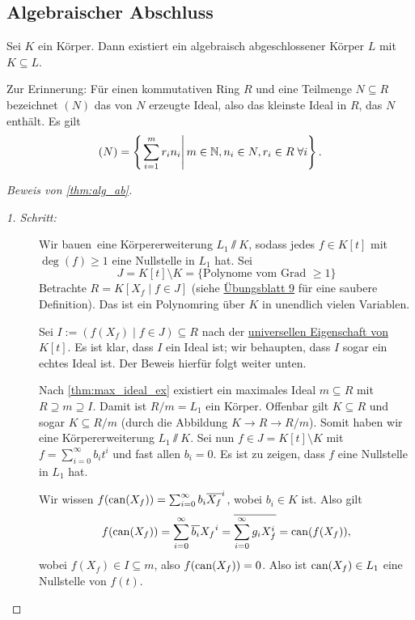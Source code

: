 \documentclass[12pt,a4paper]{scrartcl}
\begin{document}
\subsection{Algebraischer Abschluss}
\begin{satz}\label{thm:alg_ab}
	Sei $K$ ein Körper. Dann existiert ein algebraisch abgeschlossener Körper $L$ mit $K\subseteq L$.
\end{satz}

Zur Erinnerung: Für einen kommutativen Ring $R$ und eine Teilmenge $N\subseteq R$ bezeichnet $(N)$ das von $N$ erzeugte Ideal, also das kleinste Ideal in $R$, das $N$ enthält. Es gilt \[(N) = \left\{\left.\sum_{i = 1}^mr_in_i\right|m\in\mathbb N, n_i\in N, r_i\in R \;\forall i\right\}.\]

\begin{proof}[Beweis von \cref{thm:alg_ab}]
	\leavevmode
	\begin{description}
		\item[\emph{1. Schritt:}] Wir \glqq bauen\grqq\ eine Körpererweiterung $L_1\sslash K$, sodass jedes $f\in K[t]$ mit $\deg(f)\geq 1$ eine Nullstelle in $L_1$ hat. Sei 
		\[J = K[t]\setminus K = \{\text{Polynome vom Grad $\geq 1$}\}\]
		Betrachte $R = K[X_f\mid f\in J]$ (siehe \href{http://www.math.uni-bonn.de/people/palmer/EIDA-Blatt-09.pdf}{Übungsblatt 9} für eine saubere Definition).
		Das ist ein Polynomring über $K$ in unendlich vielen Variablen.
		
		Sei $I := (f(X_f)\mid f\in J)\subseteq R$ nach der \hyperref[thm:unieig_polyring]{universellen Eigenschaft von $K[t]$}. Es ist klar, dass $I$ ein Ideal ist; wir behaupten, dass $I$ sogar ein echtes Ideal ist. Der Beweis hierfür folgt weiter unten.
		
		Nach \cref{thm:max_ideal_ex} existiert ein maximales Ideal $m\subseteq R$ mit $R\supseteq m \supseteq I$. Damit ist $R/m = L_1 $ ein Körper. Offenbar gilt $K \subseteq R$ und sogar $K \subseteq R/m$ (durch die Abbildung $K\to R\to R/m$). Somit haben wir eine Körpererweiterung $L_1\sslash K$. Sei nun $f\in J = K[t]\setminus K$ mit $f = \sum_{i = 0}^{\infty} b_i t^i$ und fast allen $b_i = 0$. Es ist zu zeigen, dass $f$ eine Nullstelle in $L_1$ hat.
		
		Wir wissen $f(\operatorname{can}(X_f)) = \sum_{i = 0}^{\infty}b_i\overline{X_f}^i$, wobei $b_i\in K$ ist. Also gilt \[f(\operatorname{can}(X_f)) = \sum_{i = 0}^{\infty}\overline{b_i}{X_f}^i = \overline{\sum_{i = 0}^{\infty}g_iX_f^i} = \operatorname{can}(f(X_f)),\] wobei $f(X_f)\in I\subseteq m$, also $f(\operatorname{can}(X_f)) = 0$. Also ist $\operatorname{can}(X_f)\in L_1$ eine Nullstelle von $f(t)$.
		

\end{description}
\end{proof}
\end{document}

